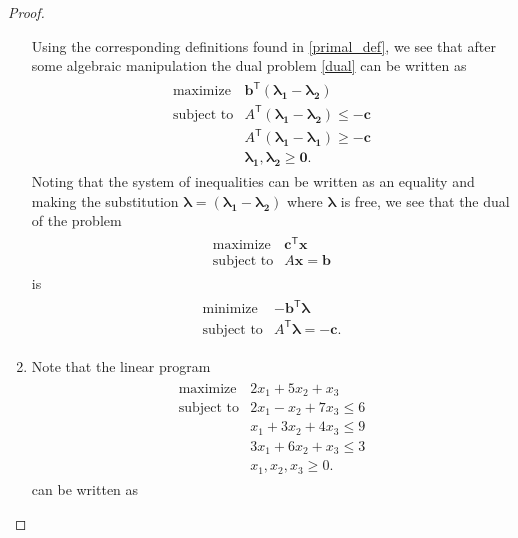 \documentclass[12pt]{article}
\theoremstyle{definition}
\newcommand{\vc}[1]{\boldsymbol{#1}}
\newcommand{\tran}{\mathsf{T}}
\begin{document}
\begin{proof}
\begin{enumerate}
      Using the corresponding definitions found in \eqref{primal_def}, we see that
      after some algebraic manipulation the dual problem \eqref{dual} can be written as
      \begin{align*}
        \begin{array}{rl}
          \text{maximize} & \vc{b}^\tran(\vc{\lambda_1} - \vc{\lambda_2}) \\
          \text{subject to} & A^\tran(\vc{\lambda_1} - \vc{\lambda_2}) \leq -\vc{c} \\
          & A^\tran(\vc{\lambda_1} - \vc{\lambda_1}) \geq -\vc{c} \\
          & \vc{\lambda_1}, \vc{\lambda_2} \geq \vc{0}.
        \end{array}
      \end{align*}
      Noting that the system of inequalities can be written as an equality and
      making the substitution $\vc{\lambda} = (\vc{\lambda_1} - \vc{\lambda_2})$
      where $\vc{\lambda}$ is free, we see that the dual of the problem
      \begin{align*}
        \begin{array}{rl}
          \text{maximize} & \vc{c}^\tran \vc{x} \\
          \text{subject to} & A\vc{x}=\vc{b}
        \end{array}
      \end{align*}
      is
      \begin{align*}
        \begin{array}{rl}
          \text{minimize} & -\vc{b}^\tran\vc{\lambda} \\
          \text{subject to} & A^\tran\vc{\lambda}= -\vc{c}.
        \end{array}
      \end{align*}
    \item Note that the linear program
      \begin{align}\label{orig_primal}
        \begin{array}{rl}
          \text{maximize} & 2x_1 + 5x_2 + x_3 \\
              \text{subject to} & 2x_1 - x_2 + 7x_3 \leq 6 \\
              & x_1 + 3x_2 + 4x_3 \leq 9 \\
              & 3x_1 + 6x_2 + x_3 \leq 3 \\
              & x_1, x_2, x_3 \geq 0.
        \end{array}
      \end{align}
      can be written as

\end{enumerate}
\end{proof}
\end{document}
